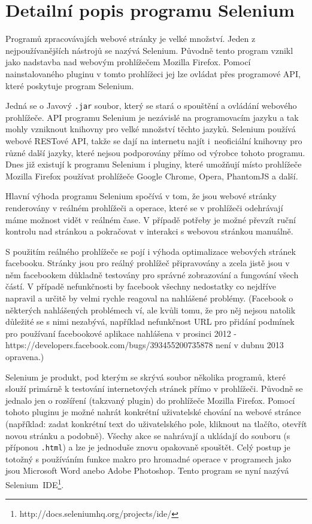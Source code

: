 \documentclass[thesis=M,czech]{FITthesis}[2013/05/10]
\begin{document}
\section{Detailní popis programu Selenium}

Programů zpracovávajích webové stránky je velké množství. Jeden z nejpoužívanějších nástrojů se nazývá Selenium. Původně tento program vznikl jako nadstavba nad webovým prohlížečem Mozilla Firefox. Pomocí nainstalovaného pluginu v tomto prohlížeci jej lze ovládat přes programové API, které poskytuje program Selenium. 

Jedná se o Javový \verb|.jar| soubor, který se stará o spouštění a ovládání webového prohlížeče. API programu Selenium je nezávislé na programovacím jazyku a tak mohly vzniknout knihovny pro velké množství těchto jazyků. Selenium používá webové RESTové API, takže se dají na internetu najít i~neoficiální knihovny pro různé další jazyky, které nejsou podporovány přímo od výrobce tohoto programu. Dnes již existují k programu Selenium i pluginy, které umožňují místo prohlížeče Mozilla Firefox používat prohlížeče Google Chrome, Opera, PhantomJS a další.

Hlavní výhoda programu Selenium spočívá v tom, že jsou webové stránky renderovány v reálném prohlížeči a operace, které se v prohlížeči odehrávají máme možnost vidět v reálném čase. V případě potřeby je možné převzít ruční kontrolu nad stránkou a pokračovat v interakci s webovou stránkou manuálně. 

S použitím reálného prohlížeče se pojí i výhoda optimalizace webových stránek facebooku. Stránky jsou pro reálný prohlížeč připravovány a zcela jistě jsou v něm facebookem důkladně testovány pro správné 
zobrazování a fungování všech částí. V případě nefunkčnosti by facebook všechny nedostatky co nejdříve napravil a určitě by velmi rychle reagoval na nahlášené problémy. (Facebook o některých nahlášených problémech ví, ale kvůli tomu, že pro něj nejsou natolik důležité se s nimi nezabývá, například nefunkčnost URL pro přidání podmínek pro používaní facebookové aplikace  nahlášena v prosinci 2012 - https://developers.facebook.com/bugs/393455200735878  není v dubnu 2013 opravena.) 

Selenium je produkt, pod kterým se skrývá soubor několika programů, které slouží primárně k testování internetových stránek přímo v prohlížeči. Původně se jednalo jen o rozšíření (takzvaný plugin) do prohlížeče Mozilla Firefox. Pomocí tohoto pluginu je možné nahrát konkrétní uživatelské chování na webové stránce (například: zadat konkrétní text do uživatelského pole, kliknout na tlačíto, otevřít novou stránku a podobně). Všechy akce se nahrávají a ukládají do souboru (s příponou \verb|.html|) a lze je jednoduše znovu opakovaně spouštět. Celý postup je totožný s používáním funkce makro pro hromadné operace v programech jako jsou Microsoft Word anebo Adobe Photoshop. Tento program se nyní nazývá Selenium~IDE\footnote{http://docs.seleniumhq.org/projects/ide/}.
\end{document}
